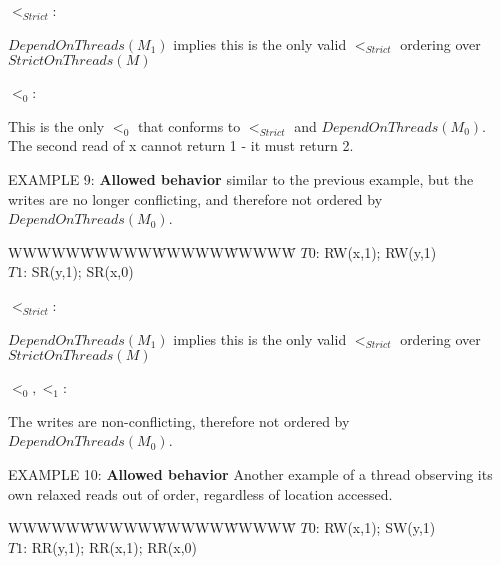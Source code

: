 \documentclass[12pt,titlepage]{article}
\newcounter{parnum}
\newcommand\np{\addtocounter{parnum}{1}\hspace{-2em}\makebox[2em][l]{\arabic{parnum}}}
\begin{document}
\bigskip
$<_{Strict}$:\hspace{0.25in}
\hspace{0.4in}
\parbox[t]{2.5in}
{$DependOnThreads(M_1)$ implies this is the only valid $<_{Strict}$ ordering
over $StrictOnThreads(M)$}

\bigskip
$<_0$:\hspace{0.5in}
\hspace{0.4in}
\parbox[t]{2.5in}
{This is the only $<_0$ that conforms to $<_{Strict}$ and $DependOnThreads(M_0)$.
The second read of x cannot return 1 - it must return 2.}

\bigskip
\np EXAMPLE 9: \textbf{Allowed behavior} 
similar to the previous example, but the writes are
no longer conflicting, and therefore not ordered by $DependOnThreads(M_0)$.

\begin{tabbing}WWWWW\=WWWWW\=WWWWW\=WWWWW\=\kill
$T0$: \> RW(x,1); \> RW(y,1)\\
$T1$: \> SR(y,1); \> SR(x,0)\\
\end{tabbing}

\bigskip
$<_{Strict}$:\hspace{0.25in}
\hspace{0.4in}
\parbox[t]{2.5in}
{$DependOnThreads(M_1)$ implies this is the only valid $<_{Strict}$ ordering
over $StrictOnThreads(M)$}

\bigskip
$<_0,<_1$:\hspace{0.25in}
\hspace{0.25in}
\parbox[t]{2.5in}
{The writes are non-conflicting, therefore not ordered by $DependOnThreads(M_0)$.}

\bigskip
\np EXAMPLE 10: \textbf{Allowed behavior} 
Another example of a thread observing its own relaxed reads out of order, 
regardless of location accessed.

\begin{tabbing}WWWWW\=WWWWW\=WWWWW\=WWWWW\=\kill
$T0$: \> RW(x,1); \> SW(y,1)\\
$T1$: \> RR(y,1); \> RR(x,1); \> RR(x,0)\\
\end{tabbing}
\end{document}
